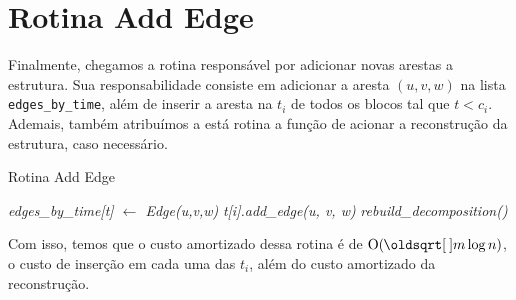 \section{Rotina Add Edge}
\label{sec:rmsf-add-edge}

Finalmente, chegamos a rotina responsável por adicionar novas arestas a estrutura. Sua responsabilidade consiste em adicionar a aresta $(u,v,w)$ na lista \texttt{edges\_by\_time}, além de inserir a aresta na $t_i$ de todos os blocos tal que $t < c_i$. Ademais, também atribuímos a está rotina a função de acionar a reconstrução da estrutura, caso necessário.

\begin{algorithm}[h!]
    \caption{Rotina Add Edge}\label{rmsf-add-edge}
    \begin{algorithmic}[1]
        \State \emph{edges\_by\_time[t] $\gets$ Edge(u,v,w)}
        \State \emph{t[i].add\_edge(u, v, w)}
        \EndFor
        \State \emph{rebuild\_decomposition()}
        \EndIf
        \EndFunction
    \end{algorithmic}
\end{algorithm}

Com isso, temos que o custo amortizado dessa rotina é de $\Oh(\sqrt{m} \log{n})$, o custo de inserção em cada uma das $t_i$, além do custo amortizado da reconstrução.

